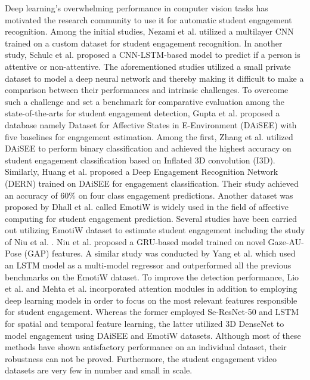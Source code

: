 Deep learning's overwhelming performance in computer vision tasks has motivated the research community to use it for automatic student engagement recognition. Among the initial studies, Nezami et al. \cite{mohamad2020automatic} utilized a multilayer CNN trained on a custom dataset for student engagement recognition. In another study, Schulc et al. \cite{schulc2019automatic} proposed a CNN-LSTM-based model to predict if a person is attentive or non-attentive. The aforementioned studies utilized a small private dataset to model a deep neural network and thereby making it difficult to make a comparison between their performances and intrinsic challenges. To overcome such a challenge and set a benchmark for comparative evaluation among the state-of-the-arts for student engagement detection, Gupta et al. \cite{gupta2016daisee}  proposed a database namely Dataset for Affective States in E-Environment (DAiSEE) with five baselines for engagement estimation. Among the first, Zhang et al. \cite{zhang2019novel} utilized DAiSEE to perform binary classification and achieved the highest accuracy on student engagement classification based on Inflated 3D convolution (I3D). Similarly, Huang et al. \cite{huang2019fine} proposed a Deep Engagement Recognition Network (DERN) trained on DAiSEE for engagement classification. Their study achieved an accuracy of  60\% on four class engagement predictions. 
Another dataset was proposed by Dhall et al. \cite{dhall2019emotiw} called EmotiW  is widely used in the field of affective computing for student engagement prediction. Several studies have been carried out utilizing EmotiW dataset to estimate student engagement including the study of Niu et al. \cite{niu2018automatic}. Niu et al. proposed a GRU-based model trained on novel Gaze-AU-Pose (GAP) features. A similar study was conducted by Yang et al. \cite{yang2018deep} which used an LSTM model as a multi-model regressor  and outperformed all the previous benchmarks on the EmotiW dataset. To improve the detection performance,  Lio et al. \citep{liao2021deep} and Mehta et al. \cite{mehta2022three} incorporated attention modules in addition to employing deep learning models in order to focus on the most relevant features responsible for student engagement. Whereas the former employed Se-ResNet-50 and LSTM for spatial and temporal feature learning, the latter utilized 3D DenseNet to model engagement using DAiSEE and EmotiW datasets. Although most of these methods have shown satisfactory performance on an individual dataset, their robustness can not be proved. Furthermore, the student engagement video datasets are very few in number and small in scale.

